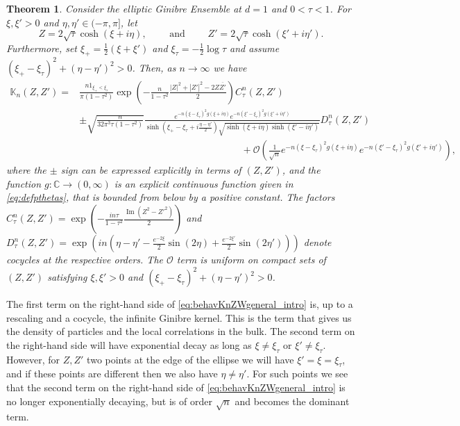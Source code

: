 \documentclass[%
 jmp,
cp,  %
 amsmath,amsthm,amssymb,%
 reprint,%
onecolumn]{revtex4-2}
\newtheorem{theorem}{Theorem}[section]
\begin{document}
\begin{theorem} \label{thm:largenKnZW_intro}
    Consider the elliptic Ginibre Ensemble at $d=1$ and $0<\tau<1$.  For $\xi,\xi'>0$ and $\eta, \eta' \in (-\pi,\pi]$, let $$Z=2 \sqrt{\tau} \cosh (\xi+i \eta),\qquad \textrm{ and }  \qquad  Z'=2 \sqrt{\tau} \cosh (\xi'+i \eta').$$ Furthermore, set $\xi_+=\frac{1}{2}(\xi+\xi')$ and $\xi_\tau=-\frac12 \log \tau$ and assume $(\xi_+ -\xi_\tau)^2+(\eta-\eta')^2>0$. Then, as $n\to\infty$ we have
    \begin{align} \nonumber
    \mathbb K_n(Z,Z') 
    = & 
    \frac{n \mathfrak{1}_{\xi_+<\xi_\tau}}{\pi (1-\tau^2)}
   \exp\left(-\frac{n}{1-\tau^2}\frac{|Z|^2+|Z'|^2-2 Z \overline{Z'}}{2}\right)C_{\tau}^n(Z,Z')
    \\ \nonumber
    &\pm \sqrt{\frac{n}{32 \pi^3 \tau(1-\tau^2)}} 
    \frac{e^{- n (\xi-\xi_\tau)^2 g(\xi+i\eta)} e^{- n (\xi'-\xi_\tau)^2 g(\xi'+i\eta')} 
    }{\sinh\left(\xi_+-\xi_\tau + i \frac{\eta-\eta'}{2}\right)\sqrt{\sinh(\xi+i\eta) \sinh(\xi'-i\eta')}}D_{\tau}^n(Z,Z')\\ \label{eq:behavKnZWgeneral_intro}
    &\hspace{7cm} + \mathcal O\left(\frac{1}{\sqrt n} e^{- n (\xi-\xi_\tau)^2 g(\xi+i\eta)} e^{- n (\xi'-\xi_\tau)^2 g(\xi'+i\eta')}\right),
    \end{align} 
    where the $\pm$ sign can be expressed explicitly in terms of $(Z,Z')$, and the function $g: \mathbb C \to (0,\infty)$ is an explicit continuous function 
    given in \eqref{eq:defpthetas}, 
    that is bounded from below by a positive constant.
The factors $C_{\tau}^n(Z,Z')=\exp\left(- \frac{i n \tau }{ 1-\tau^2} \frac{\operatorname{Im}(Z^2-Z'^2)}{2}\right)$    and $D_{\tau}^n(Z,Z')= \exp\left(i n (\eta-\eta' - \frac{e^{-2\xi}}{2} \sin(2\eta)+\frac{e^{-2\xi'}}{2} \sin(2\eta'))\right)$
    denote cocycles at the respective orders.
    The $\mathcal O$ term is uniform on compact sets of $(Z,Z')$ satisfying $\xi, \xi'>0$ and $(\xi_+ -\xi_\tau)^2+(\eta-\eta')^2>0$.
    \end{theorem}
    
    The first term on the right-hand side of \eqref{eq:behavKnZWgeneral_intro} is, up to a rescaling and a cocycle, the infinite Ginibre kernel. This  is the term that gives us the density of particles and the local correlations in the bulk. The second term on the right-hand side will have exponential decay  as long as  $\xi\neq \xi_\tau$ or $\xi'\neq \xi_\tau$.  However, for  $Z,Z'$  two  points at the edge of the ellipse we will have $\xi'=\xi=\xi_\tau$, and if these points are different then we also have $\eta\neq \eta'$. For such points we see that the second term on the right-hand side of \eqref{eq:behavKnZWgeneral_intro} is no longer exponentially decaying, but is of order $\sqrt n$ and  becomes the dominant term. 
    
\end{document}
